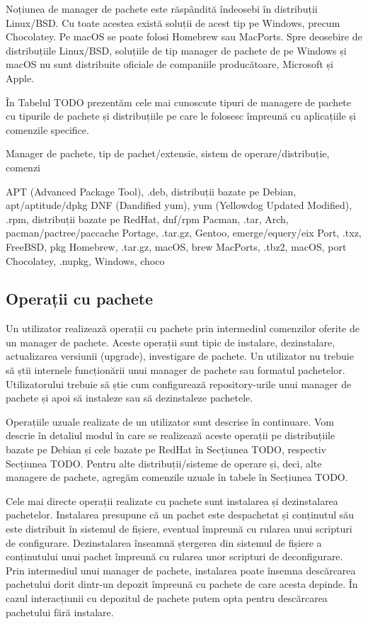 Noțiunea de manager de pachete este răspândită îndeosebi în distribuții Linux/BSD. Cu toate acestea există soluții de acest tip pe Windows, precum Chocolatey. Pe macOS se poate folosi Homebrew sau MacPorts. Spre deosebire de distribuțiile Linux/BSD, soluțiile de tip manager de pachete de pe Windows și macOS nu sunt distribuite oficiale de companiile producătoare, Microsoft și Apple.

În Tabelul TODO prezentăm cele mai cunoscute tipuri de managere de pachete cu tipurile de pachete și distribuțiile pe care le folosesc împreună cu aplicațiile și comenzile specifice.

Manager de pachete, tip de pachet/extensie, sistem de operare/distribuție, comenzi

APT (Advanced Package Tool), .deb, distribuții bazate pe Debian, apt/aptitude/dpkg
DNF (Dandified yum), yum (Yellowdog Updated Modified), .rpm, distribuții bazate pe RedHat, dnf/rpm
Pacman, .tar, Arch, pacman/pactree/paccache
Portage, .tar.gz, Gentoo, emerge/equery/eix
Port, .txz, FreeBSD, pkg
Homebrew, .tar.gz, macOS, brew
MacPorts, .tbz2, macOS, port
Chocolatey, .nupkg, Windows, choco

\subsection{Operații cu pachete}
\label{sec:package:ops}

Un utilizator realizează operații cu pachete prin intermediul comenzilor oferite de un manager de pachete. Aceste operații sunt tipic de instalare, dezinstalare, actualizarea versiunii (upgrade), investigare de pachete. Un utilizator nu trebuie să știi internele funcționării unui manager de pachete sau formatul pachetelor. Utilizatorului trebuie să știe cum configurează repository-urile unui manager de pachete și apoi să instaleze sau să dezinstaleze pachetele.

Operațiile uzuale realizate de un utilizator sunt descrise în continuare. Vom descrie în detaliul modul în care se realizează aceste operații pe distribuțiile bazate pe Debian și cele bazate pe RedHat în Secțiunea TODO, respectiv Secțiunea TODO. Pentru alte distribuții/sisteme de operare și, deci, alte managere de pachete, agregăm comenzile uzuale în tabele în Secțiunea TODO.

Cele mai directe operații realizate cu pachete sunt instalarea și dezinstalarea pachetelor. Instalarea presupune că un pachet este despachetat și conținutul său este distribuit în sistemul de fișiere, eventual împreună cu rularea unui scripturi de configurare. Dezinstalarea înseamnă ștergerea din sistemul de fișiere a conținutului unui pachet împreună cu rularea unor scripturi de deconfigurare. Prin intermediul unui manager de pachete, instalarea poate însemna descărcarea pachetului dorit dintr-un depozit împreună cu pachete de care acesta depinde. În cazul interacțiunii cu depozitul de pachete putem opta pentru descărcarea pachetului fără instalare.

